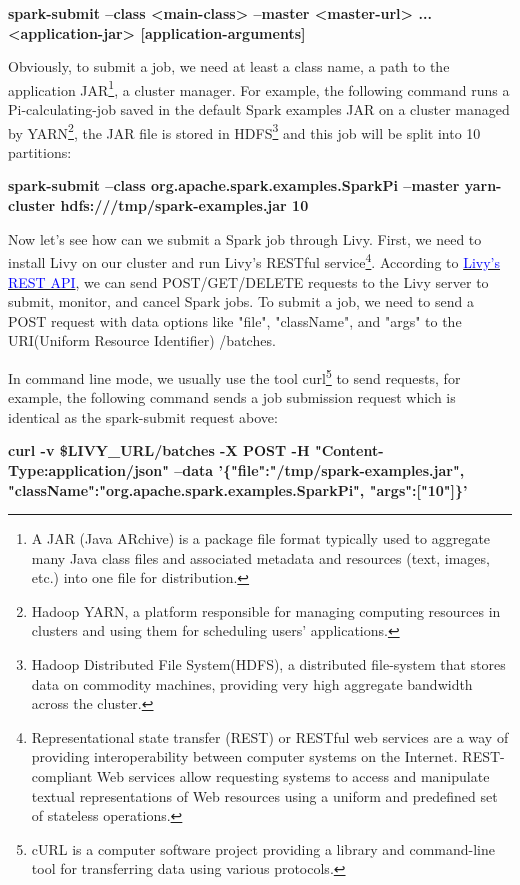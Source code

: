 \documentclass[article,colorback,accentcolor=tud4c]{tudreport}
\begin{document}
	\noindent\textbf{spark-submit --class <main-class> --master <master-url> ... <application-jar> [application-arguments]}
	
	Obviously, to submit a job, we need at least a class name, a path to the application JAR\footnote{A JAR (Java ARchive) is a package file format typically used to aggregate many Java class files and associated metadata and resources (text, images, etc.) into one file for distribution.\cite{jar}}, a cluster manager. For example, the following command runs a Pi-calculating-job saved in the default Spark examples JAR on a cluster managed by YARN\footnote{Hadoop YARN, a platform responsible for managing computing resources in clusters and using them for scheduling users' applications.\cite{hadoop}}, the JAR file is stored in HDFS\footnote{Hadoop Distributed File System(HDFS), a distributed file-system that stores data on commodity machines, providing very high aggregate bandwidth across the cluster.\cite{hadoop}} and this job will be split into 10 partitions:
	
	\noindent\textbf{spark-submit --class org.apache.spark.examples.SparkPi   --master yarn-cluster hdfs:///tmp/spark-examples.jar 10}
		
	Now let's see how can we submit a Spark job through Livy. First, we need to install Livy on our cluster and run Livy's RESTful service\footnote{Representational state transfer (REST) or RESTful web services are a way of providing interoperability between computer systems on the Internet. REST-compliant Web services allow requesting systems to access and manipulate textual representations of Web resources using a uniform and predefined set of stateless operations.\cite{rest}}. According to \href{https://livy.incubator.apache.org/docs/latest/rest-api.html}{\textcolor{blue}{Livy's REST API}}, we can send POST/GET/DELETE requests to the Livy server to submit, monitor, and cancel Spark jobs. To submit a job, we need to send a POST request with data options like "file", "className", and "args" to the URI(Uniform Resource Identifier) /batches. 
	
	In command line mode, we usually use the tool curl\footnote{cURL is a computer software project providing a library and command-line tool for transferring data using various protocols.\cite{curl}} to send requests, for example, the following command sends a job submission request which is identical as the spark-submit request above:
	
	\noindent\textbf{curl -v \$LIVY\_URL/batches -X POST -H "Content-Type:application/json" --data '\{"file":"/tmp/spark-examples.jar", "className":"org.apache.spark.examples.SparkPi", "args":["10"]\}'}
	
\end{document}
